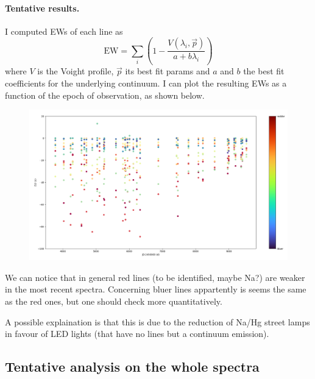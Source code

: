 \documentclass{article}
\begin{document}
\paragraph{Tentative results.} I computed EWs of each line as
\[ \text{EW} = \sum_i \left( 1-\frac{V(\lambda_i,\vec p)}{a+b\lambda_i}  \right) \]
where $V$ is the Voight profile, $\vec p$ its best fit params and $a$ and $b$ the best fit coefficients for the underlying continuum. I can plot the resulting EWs as a function of the epoch of observation, as shown below.
\begin{figure}[h!]
	\centering
	\includegraphics[width=.9\textwidth]{../EWs}
\end{figure}
We can notice that in general red lines (to be identified, maybe Na?) are weaker in the most recent spectra. Concerning bluer lines appartently is seems the same as the red ones, but one should check more quantitatively.

A possible explaination is that this is due to the reduction of Na/Hg street lamps in favour of LED lights (that have no lines but a continuum emission).

\subsection{Tentative analysis on the whole spectra}
\end{document}
